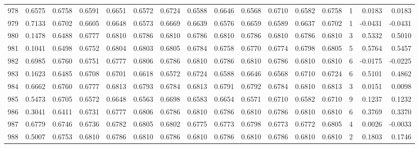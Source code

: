 \begin{tabular}{lrrrrrrrrrrrrrrr}
978 &      0.6575 &  0.6758 &  0.6591 &  0.6651 &  0.6572 &  0.6724 &  0.6588 &  0.6646 &  0.6568 &  0.6710 &   0.6582 &     0.6758 &      1 &                    0.0183 &                     0.0183 \\
979 &      0.7133 &  0.6702 &  0.6605 &  0.6648 &  0.6573 &  0.6669 &  0.6639 &  0.6576 &  0.6659 &  0.6589 &   0.6637 &     0.6702 &      1 &                   -0.0431 &                    -0.0431 \\
980 &      0.1478 &  0.6488 &  0.6777 &  0.6810 &  0.6786 &  0.6810 &  0.6786 &  0.6810 &  0.6786 &  0.6810 &   0.6786 &     0.6810 &      3 &                    0.5332 &                     0.5010 \\
981 &      0.1041 &  0.6498 &  0.6752 &  0.6804 &  0.6803 &  0.6805 &  0.6784 &  0.6758 &  0.6770 &  0.6774 &   0.6798 &     0.6805 &      5 &                    0.5764 &                     0.5457 \\
982 &      0.6985 &  0.6760 &  0.6751 &  0.6777 &  0.6806 &  0.6786 &  0.6810 &  0.6786 &  0.6810 &  0.6786 &   0.6810 &     0.6810 &      6 &                   -0.0175 &                    -0.0225 \\
983 &      0.1623 &  0.6485 &  0.6708 &  0.6701 &  0.6618 &  0.6572 &  0.6724 &  0.6588 &  0.6646 &  0.6568 &   0.6710 &     0.6724 &      6 &                    0.5101 &                     0.4862 \\
984 &      0.6662 &  0.6760 &  0.6777 &  0.6813 &  0.6793 &  0.6784 &  0.6813 &  0.6791 &  0.6792 &  0.6784 &   0.6810 &     0.6813 &      3 &                    0.0151 &                     0.0098 \\
985 &      0.5473 &  0.6705 &  0.6572 &  0.6648 &  0.6563 &  0.6698 &  0.6583 &  0.6654 &  0.6571 &  0.6710 &   0.6582 &     0.6710 &      9 &                    0.1237 &                     0.1232 \\
986 &      0.3041 &  0.6411 &  0.6731 &  0.6777 &  0.6806 &  0.6786 &  0.6810 &  0.6786 &  0.6810 &  0.6786 &   0.6810 &     0.6810 &      6 &                    0.3769 &                     0.3370 \\
987 &      0.6779 &  0.6746 &  0.6736 &  0.6782 &  0.6805 &  0.6802 &  0.6775 &  0.6773 &  0.6798 &  0.6773 &   0.6772 &     0.6805 &      4 &                    0.0026 &                    -0.0033 \\
988 &      0.5007 &  0.6753 &  0.6810 &  0.6786 &  0.6810 &  0.6786 &  0.6810 &  0.6786 &  0.6810 &  0.6786 &   0.6810 &     0.6810 &      2 &                    0.1803 &                     0.1746 \\

\end{tabular}
